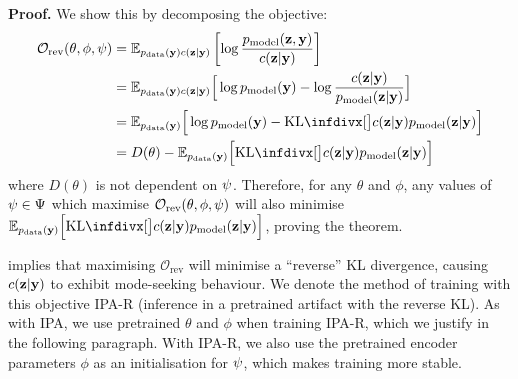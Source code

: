 \textbf{Proof.}
We show this by decomposing the objective:
\begin{align} \label{eq:reverse-obj-supp}
  \mathcal{O}_\text{rev}(\theta, \phi, \partphi{}) &= \EX_{\pdata{}(\partI{})\partq{}(\z{}|\partI{})} \left[ \log\frac{\pmodel{}(\z{},\partI{})}{\partq{}(\z{}|\partI{})} \right] \\
                                                   &= \EX_{\pdata{}(\partI{})\partq{}(\z{}|\partI{})}\Big[ \log \pmodel{}(\partI{}) - \log\frac{\partq{}(\z{}|\partI{})}{\pmodel{}(\z{}|\partI{})} \Big] \\
  &= \EX_{\pdata{}(\partI{})}\Big[ \log \pmodel{}(\partI{}) - \kl[\big] { \partq{}(\z{}|\partI{}) }{ \pmodel{}(\z{}|\partI{}) } \Big] \\
                                                   &= D(\theta) - \EX_{\pdata{}(\partI{})}\Big[ \kl[\big] { \partq{}(\z{}|\partI{}) }{ \pmodel{}(\z{}|\partI{}) } \Big]
\end{align}
where $D(\theta)$ is not dependent on $\psi$. Therefore, for any $\theta$
and $\phi$, any values of $\psi\in\Psi$ which maximise
$\mathcal{O}_\text{rev}(\theta, \phi, \psi{})$ will also minimise
$\EX_{\pdata{}(\partI{})}\Big[ \kl[\big] { \partq{}(\z{}|\partI{}) }{
  \pmodel{}(\z{}|\partI{}) } \Big]$, proving the theorem.


 implies that maximising $\mathcal{O}_{\text{rev}}$
will minimise a ``reverse'' KL divergence, causing $c{}(\mathbf{z}{}|\mathbf{y}{})$ to
exhibit mode-seeking behaviour. We denote the method of training with this
objective IPA-R (inference in a pretrained artifact with the reverse KL).
As with IPA, we use pretrained $\theta$ and $\phi$ when training IPA-R, which we
justify in the following paragraph. With IPA-R, we also use the pretrained
encoder parameters $\phi$ as an initialisation for $\psi{}$, which makes
training more stable.


